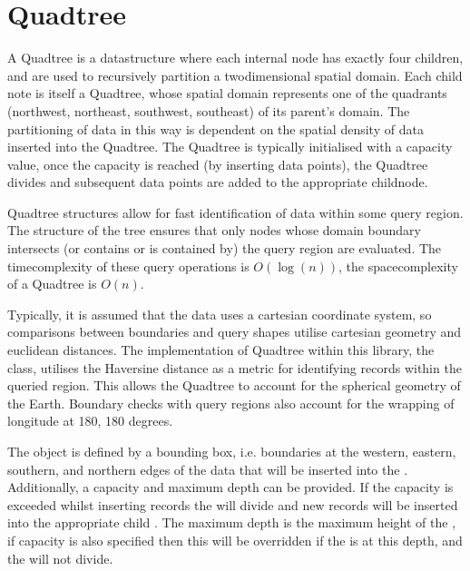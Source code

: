 \documentclass[letterpaper,10pt,english]{sphinxmanual}
\begin{document}
\chapter{Quadtree}
\label{\detokenize{quadtree:quadtree}}\label{\detokenize{quadtree::doc}}
\sphinxAtStartPar
A Quadtree is a data\sphinxhyphen{}structure where each internal node has exactly four children, and are used to recursively partition
a two\sphinxhyphen{}dimensional spatial domain. Each child note is itself a Quadtree, whose spatial domain represents one of the
quadrants (north\sphinxhyphen{}west, north\sphinxhyphen{}east, south\sphinxhyphen{}west, south\sphinxhyphen{}east) of its parent’s domain. The partitioning of data in this way
is dependent on the spatial density of data inserted into the Quadtree. The Quadtree is typically initialised with a
capacity value, once the capacity is reached (by inserting data points), the Quadtree divides and subsequent data points
are added to the appropriate child\sphinxhyphen{}node.

\sphinxAtStartPar
Quadtree structures allow for fast identification of data within some query region. The structure of the tree ensures
that only nodes whose domain boundary intersects (or contains or is contained by) the query region are evaluated. The
time\sphinxhyphen{}complexity of these query operations is \(O(\log(n))\), the space\sphinxhyphen{}complexity of a Quadtree is \(O(n)\).

\sphinxAtStartPar
Typically, it is assumed that the data uses a cartesian coordinate system, so comparisons between boundaries and query
shapes utilise cartesian geometry and euclidean distances. The implementation of Quadtree within this library, the
 class, utilises the Haversine distance as a metric for identifying records within the queried region.
This allows the Quadtree to account for the spherical geometry of the Earth. Boundary checks with query regions also
account for the wrapping of longitude at \sphinxhyphen{}180, 180 degrees.

\sphinxAtStartPar
The  object is defined by a bounding box, i.e. boundaries at the western, eastern, southern, and northern edges of
the data that will be inserted into the . Additionally, a capacity and maximum depth can be provided. If the
capacity is exceeded whilst inserting records the  will divide and new records will be inserted into the appropriate
child . The maximum depth is the maximum height of the , if capacity is also specified then this will be
overridden if the  is at this depth, and the  will not divide.
\end{document}
